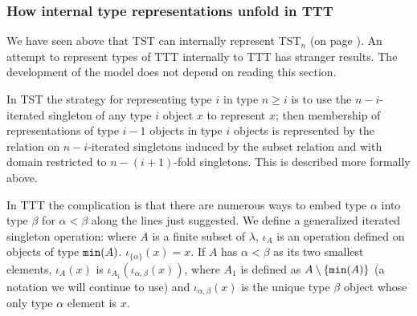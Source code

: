 \documentclass[112pt]{article}
\begin{document}
\newpage



\subsubsection{How internal type representations unfold in TTT}

We have seen above that TST can internally represent TST$_n$ (on page \pageref{tstnmodel}).   An attempt to represent types of TTT internally to TTT has stranger results.  The development of the model does not depend on reading this section.

In TST the strategy for representing type $i$ in type $n\geq i$  is to use the $n-i$-iterated singleton of any type $i$ object $x$ to represent $x$;  then membership of representations of type $i-1$ objects in type
$i$ objects is represented by the relation on $n-i$-iterated singletons induced by the subset relation and with domain restricted to $n-(i+1)$-fold singletons.  This is described more formally above.

In TTT the complication is that there are numerous ways to embed type $\alpha$ into type $\beta$ for $\alpha<\beta$ along the lines just suggested.    We define a generalized
iterated singleton operation:  where $A$ is a finite subset of $\lambda$, $\iota_A$ is an operation defined on objects of type ${\tt min}(A)$.  $\iota_{\{\alpha\}}(x)=x$.
If $A$ has $\alpha<\beta$ as its two smallest elements, $\iota_A(x)$ is  $\iota_{A_1}(\iota_{\alpha,\beta}(x))$, where $A_1$ is defined as $A \setminus \{{\tt min}(A)\}$ (a notation we will continue to use) and $\iota_{\alpha,\beta}(x)$ is the unique type $\beta$ object whose only type $\alpha$ element is $x$.
\end{document}
